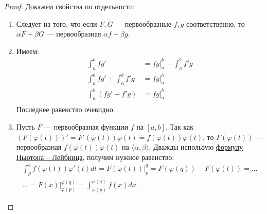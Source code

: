 \begin{proof}
	Докажем свойства по отдельности:
	\begin{enumerate}
		\item Следует из того, что если $F, G$ --- первообразные $f, g$ соответственно,
		то $\alpha F + \beta G$ --- первообразная $\alpha f + \beta g$.
		\item Имеем:
		\begin{align*}
			\int_a^b fg' &= fg \bigg|_a^b - \int_a^b f'g \\
			\int_a^b fg' + \int_a^b f'g &= fg \bigg|_a^b \\
			\int_a^b (fg' + f'g) &= fg \bigg|_a^b		   \\
		\end{align*}
		Последнее равенство очевидно.
		\item Пусть $F$ --- первообразная функции $f$ на $[a, b]$. Так как \\ 
		\hbox{$(F(\varphi(t)))' = F'(\varphi(t)) \varphi(t) = f(\varphi(t)) \varphi(t)$}, то
		$F(\varphi(t))$ --- первообразная $f(\varphi(t)) \varphi(t)$ на $\langle \alpha, \beta \rangle$.
		Дважды использую \hyperlink{t9}{формулу Ньютона -- Лейбница}, получим нужное равенство:
		\begin{align*}
	 		\int_p^q f(\varphi(t))\varphi'(t) dt = F(\varphi(t)) \bigg|_p^q = F(\varphi(q)) - F(\varphi(t)) = \ldots \\
			\ldots = F(x) \bigg|_{\varphi(p)}^{\varphi(q)} = \int_{\varphi(p)}^{\varphi(q)} f(x) dx.
		\end{align*}
	\end{enumerate}
\end{proof}

